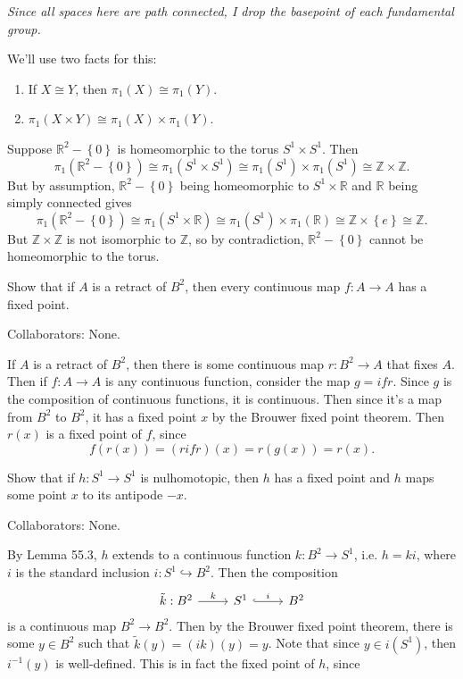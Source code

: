 \documentclass[twoside,10pt]{report}
\begin{document}
\textit{Since all spaces here are path connected, I drop the basepoint of each fundamental group.}
\vspace{5mm}

We'll use two facts for this:
\begin{enumerate}
	\item If $X \cong Y$, then $\pi_1(X) \cong \pi_1(Y)$.
	\item $\pi_1(X \times Y) \cong \pi_1(X) \times \pi_1(Y)$.
\end{enumerate}
Suppose $\mathbb{R}^{2}-\left\{ 0 \right\}$ is homeomorphic to the torus $S^{1}\times S^{1}$. Then
\[
	\pi_1(\mathbb{R}^{2}-\left\{ 0 \right\})\cong \pi_1(S^{1}\times S^{1})\cong \pi_1(S^{1})\times \pi_1(S^{1}) \cong \mathbb{Z}\times \mathbb{Z}.
\] 
But by assumption, $\mathbb{R}^{2}-\left\{ 0 \right\}$ being homeomorphic to $S^{1}\times \mathbb{R}$ and $\mathbb{R}$ being simply connected gives
\[
	\pi_1(\mathbb{R}^{2}-\left\{ 0 \right\})\cong \pi_1(S^{1}\times \mathbb{R}) \cong \pi_1(S^{1})\times \pi_1(\mathbb{R}) \cong \mathbb{Z}\times \left\{ e \right\} \cong \mathbb{Z}.
\] 
But $\mathbb{Z} \times \mathbb{Z}$ is not isomorphic to $\mathbb{Z}$, so by contradiction, $\mathbb{R}^{2}-\left\{ 0 \right\}$ cannot be homeomorphic to the torus.

\newpage
\begin{exer}[Munkres \S 55 \#1]
	Show that if $A$ is a retract of $B^{2}$, then every continuous map $f:A\to A$ has a fixed point.
\end{exer}
{\color{blue}Collaborators: None.}

If $A$ is a retract of $B^{2}$, then there is some continuous map $r:B^{2}\to A$ that fixes $A$. Then if $f:A\to A$ is any continuous function, consider the map $g = ifr$. Since $g$ is the composition of continuous functions, it is continuous. Then since it's a map from $B^{2}$ to $B^{2}$, it has a fixed point $x$ by the Brouwer fixed point theorem. Then $r(x)$ is a fixed point of $f$, since
\[
	f(r(x)) = (rifr)(x) = r(g(x)) = r(x).
\] 

\newpage
\begin{exer}[Munkres \S 55 \#2]
	Show that if $h:S^{1}\to S^{1}$ is nulhomotopic, then $h$ has a fixed point and $h$ maps some point $x$ to its antipode $-x$.
\end{exer}
{\color{blue}Collaborators: None.}

By Lemma 55.3, $h$ extends to a continuous function $k:B^{2}\to S^{1}$, i.e. $h = ki$, where $i$ is the standard inclusion $i: S^{1}\hookrightarrow B^{2}$. Then the composition
\[
\begin{tikzcd}
	\tilde{k}:B^{2}\rar{k}&S^{1}\arrow[r,hook,"i"]&B^{2}
\end{tikzcd}
\] 
is a continuous map $B^{2}\to B^{2}$. Then by the Brouwer fixed point theorem, there is some $y \in B^{2}$ such that $\tilde{k}(y) = (ik)(y)=y$. Note that since $y \in i(S^{1})$, then $i^{-1}(y)$ is well-defined. This is in fact the fixed point of $h$, since
\end{document}
